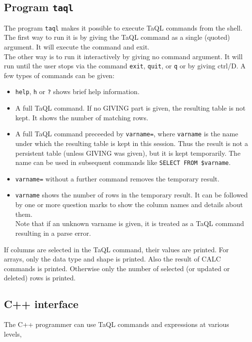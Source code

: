 \subsection{Program \texttt{taql}}
  The program \texttt{taql} makes it possible to execute TaQL commands
  from the shell. 
  \\The first way to run it is by giving the TaQL command as a single
  (quoted) argument. It will execute the command and exit.
  \\The other way is to run it interactively by giving no command
  argument. It will run until the user stops via the
  command \texttt{exit}, \texttt{quit}, or \texttt{q} or by giving
  ctrl/D. A few types of commands can be given:
  \begin{itemize}
    \item \texttt{help}, \texttt{h} or \texttt{?} shows brief help information.
    \item A full TaQL command. If no GIVING part is given, the
      resulting table is not kept. It shows the number of matching rows.
    \item A full TaQL command preceeded by \texttt{varname=}, where
      \texttt{varname} is the name under which the resulting table is
      kept in this session. Thus the result is not a persistent table
      (unless GIVING was given), but it is kept temporarily.
      The name can be used in subsequent commands like
      \texttt{SELECT FROM \$varname}.
    \item \texttt{varname=} without a further command removes the
      temporary result.
    \item \texttt{varname} shows the number of rows in the temporary
      result. It can be followed by one or more question marks to show
      the column names and details about them.
      \\Note that if an unknown varname is given, it is treated as a
      TaQL command resulting in a parse error.
  \end{itemize}
  If columns are selected in the TaQL command, their values are
  printed. For arrays, only the data type and shape is printed. Also the result of
  CALC commands is printed. Otherwise only the number of selected (or
  updated or deleted) rows is printed.

\subsection{C++ interface}
The C++ programmer can use TaQL commands and expressions at various levels,
